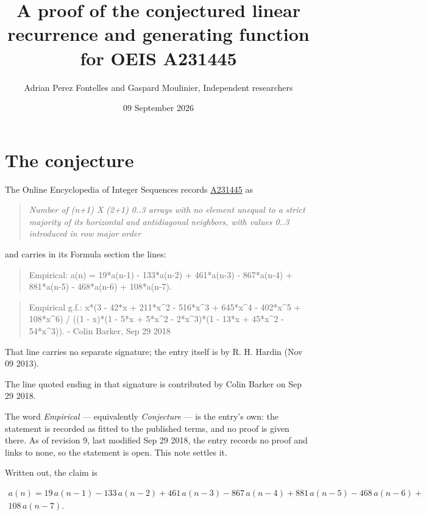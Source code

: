 \documentclass[11pt]{article}
\title{A proof of the conjectured linear recurrence and generating function for OEIS A231445}
\author{Adrian Perez Fontelles and Gaspard Moulinier, Independent researchers}
\date{09 September 2026}
\theoremstyle{definition}
\begin{document}
\maketitle
\section{The conjecture}

The Online Encyclopedia of Integer Sequences records \href{https://oeis.org/A231445}{A231445} as

\begin{quote}\itshape Number of (n+1) X (2+1) 0..3 arrays with no element unequal to a strict majority of its horizontal and antidiagonal neighbors, with values 0..3 introduced in row major order\end{quote}

and carries in its Formula section the lines:

\begin{quote}\ttfamily Empirical: a(n) = 19*a(n-1) - 133*a(n-2) + 461*a(n-3) - 867*a(n-4) + 881*a(n-5) - 468*a(n-6) + 108*a(n-7).\end{quote}

\begin{quote}\ttfamily Empirical g.f.: x*(3 - 42*x + 211*x\textasciicircum{}2 - 516*x\textasciicircum{}3 + 645*x\textasciicircum{}4 - 402*x\textasciicircum{}5 + 108*x\textasciicircum{}6) / ((1 - x)*(1 - 5*x + 5*x\textasciicircum{}2 - 2*x\textasciicircum{}3)*(1 - 13*x + 45*x\textasciicircum{}2 - 54*x\textasciicircum{}3)). - Colin Barker, Sep 29 2018\end{quote}

That line carries no separate signature; the entry itself is by R. H. Hardin (Nov 09 2013).

The line quoted ending in that signature is contributed by Colin Barker on Sep 29 2018.

The word {\itshape Empirical} --- equivalently {\itshape Conjecture} --- is the entry's own: the statement is recorded as fitted to the published terms, and no proof is given there. As of revision 9, last modified Sep 29 2018, the entry records no proof and links to none, so the statement is open. This note settles it.

Written out, the claim is

\begin{multline*} a(n) = 19\,a(n-1) - 133\,a(n-2) + 461\,a(n-3) - 867\,a(n-4) + 881\,a(n-5) - 468\,a(n-6) + \\ 108\,a(n-7). \end{multline*}
\end{document}
